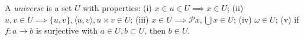 A \emph{universe} is a set $U$ with properties: (i) $x \in u \in U \implies x \in U$; (ii) $u, v \in U \implies \{u, v\}, \langle u, v \rangle, u \times v \in U$; (iii) $x \in U \implies \mathcal{P}x, \bigcup x \in U$; (iv) $\omega \in U$; (v) if $f: a \to b$ is surjective with $a \in U, b \subset U$, then $b \in U$.
